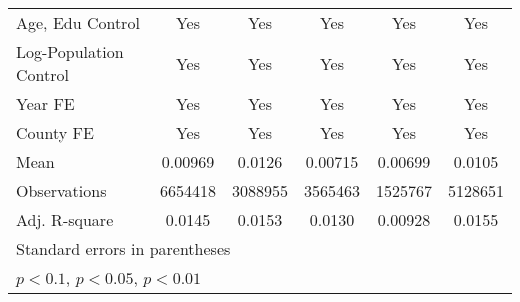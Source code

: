 {{\begin{tabular}{l*{5}{c}}
        Age, Edu Control                        & Yes                             & Yes                             & Yes                        & Yes                       & Yes                           \\
        Log-Population Control                  & Yes                             & Yes                             & Yes                        & Yes                       & Yes                           \\
        Year FE                                 & Yes                             & Yes                             & Yes                        & Yes                       & Yes                           \\
        County FE                               & Yes                             & Yes                             & Yes                        & Yes                       & Yes                           \\
        \midrule
        Mean                                    & 0.00969                         & 0.0126                          & 0.00715                    & 0.00699                   & 0.0105                        \\
        Observations                            & 6654418                         & 3088955                         & 3565463                    & 1525767                   & 5128651                       \\
        Adj. R-square                           & 0.0145                          & 0.0153                          & 0.0130                     & 0.00928                   & 0.0155                        \\
        \bottomrule
        \multicolumn{6}{l}{\footnotesize Standard errors in parentheses}                                                                                                                                     \\
        \multicolumn{6}{l}{\footnotesize \sym{*} \(p<0.1\), \sym{**} \(p<0.05\), \sym{***} \(p<0.01\)}                                                                                                       \\
    \end{tabular}
}
}